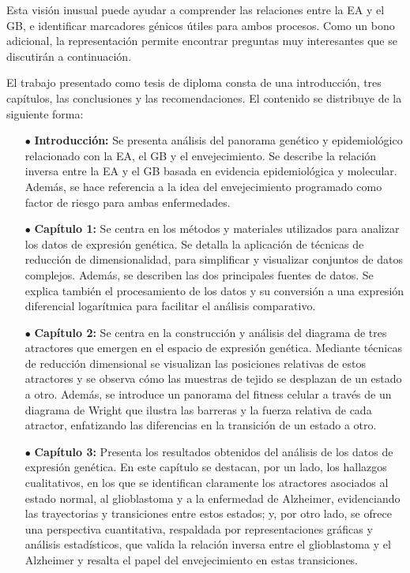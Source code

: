 Esta visión inusual puede ayudar a comprender las relaciones entre la EA y el GB, e identificar marcadores génicos útiles para ambos procesos. Como un bono adicional, la representación permite encontrar preguntas muy interesantes que se discutirán a continuación.

El trabajo presentado como tesis de diploma consta de una introducción, tres capítulos, las conclusiones y las recomendaciones. El contenido se distribuye de la siguiente forma:

\begin{itemize}
	\item[$\bullet$] \textbf{Introducción:} Se presenta análisis del panorama genético y epidemiológico relacionado con la EA, el GB y el envejecimiento. Se describe la relación inversa entre la EA y el GB basada en evidencia epidemiológica y molecular. Además, se hace referencia a la idea del envejecimiento programado como factor de riesgo para ambas enfermedades.
	
	\item[$\bullet$] \textbf{Capítulo 1:} Se centra en los métodos y materiales utilizados para analizar los datos de expresión genética. Se detalla la aplicación de técnicas de reducción de dimensionalidad, para simplificar y visualizar conjuntos de datos complejos. Además, se describen las dos principales fuentes de datos. Se explica también el procesamiento de los datos y su conversión a una expresión diferencial logarítmica para facilitar el análisis comparativo.
	
	\item[$\bullet$] \textbf{Capítulo 2:} Se centra en la construcción y análisis del diagrama de tres atractores que emergen en el espacio de expresión genética. Mediante técnicas de reducción dimensional se visualizan las posiciones relativas de estos atractores y se observa cómo las muestras de tejido se desplazan de un estado a otro. Además, se introduce un panorama del fitness celular a través de un diagrama de Wright que ilustra las barreras y la fuerza relativa de cada atractor, enfatizando las diferencias en la transición de un estado a otro.
	
	\item[$\bullet$] \textbf{Capítulo 3:} Presenta los resultados obtenidos del análisis de los datos de expresión genética. En este capítulo se destacan, por un lado, los hallazgos cualitativos, en los que se identifican claramente los atractores asociados al estado normal, al glioblastoma y a la enfermedad de Alzheimer, evidenciando las trayectorias y transiciones entre estos estados; y, por otro lado, se ofrece una perspectiva cuantitativa, respaldada por representaciones gráficas y análisis estadísticos, que valida la relación inversa entre el glioblastoma y el Alzheimer y resalta el papel del envejecimiento en estas transiciones.
	

\end{itemize}
